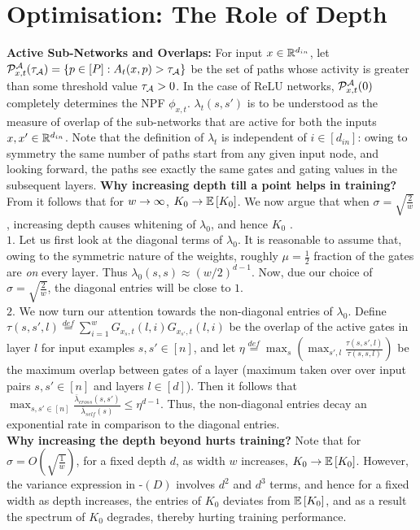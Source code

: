 \section{Optimisation: The Role of Depth}\label{sec:optimisation}
\textbf{Active Sub-Networks and Overlaps:} For input $x\in\mathbb{R}^{d_{in}}$, let $\mathcal{P}^{\mathcal{A}}_{x,t}(\tau_{\mathcal{A}})=\{p\in[P]:A_t(x,p)>\tau_{\mathcal{A}}\}$ be the set of paths whose activity is greater than some threshold value $\tau_{\mathcal{A}}>0$. In the case of ReLU networks, $\mathcal{P}^{\mathcal{A}}_{x,t}(0)$ completely determines the NPF $\phi_{x,t}$. $\lambda_t(s,s')$ is to be understood as the measure of overlap of the sub-networks that are active for both the inputs $x,x'\in\mathbb{R}^{d_{in}}$. Note that the definition of $\lambda_t$ is independent of $i\in [d_{in}]$: owing to symmetry the same number of paths start from any given input node, and looking forward, the paths see exactly the same gates and gating values in the subsequent layers.
\textbf{Why increasing depth till a point helps in training? }From  it follows that for $w\rightarrow\infty$, $K_0\rightarrow\mathbb{E}\left[K_0\right]$. We now argue that when $\sigma=\sqrt{\frac{2}{w}}$, increasing depth causes whitening of $\lambda_0$, and hence $K_0$ .\hfill\\
$1.$ Let us first look at the diagonal terms of $\lambda_0$. It is reasonable to assume that, owing to the symmetric nature of the weights, roughly $\mu=\frac{1}{2}$ fraction of the gates are \emph{on} every layer. Thus $\lambda_0(s,s)\approx (w/2)^{d-1}$. Now, due our choice of $\sigma=\sqrt{\frac{2}{w}}$, the diagonal entries will be close to $1$.\hfill\\
$2.$ We now turn our attention towards the non-diagonal entries of $\lambda_0$. Define $\tau(s,s',l)\stackrel{def}=\sum_{i=1}^w G_{x_s,t}(l,i)G_{x_{s'},t}(l,i)$ be the overlap of the active gates in layer $l$ for input examples $s,s'\in[n]$, and  let $\eta\stackrel{def}=\max_s\left(\max_{s',l} \frac{\tau(s,s',l)}{\tau(s,s,l)}\right)$ be the maximum overlap between gates of a layer (maximum taken over over input pairs $s,s'\in[n]$ and layers $l\in [d]$).  Then it follows that $\max_{s,s'\in [n]} \frac{\bar{\lambda}_{cross}(s,s')}{\bar{\lambda}_{self}(s)}\leq \eta^{d-1}$. Thus, the non-diagonal entries decay an exponential rate in comparison to the diagonal entries.\hfill\\
\textbf{Why increasing the depth beyond hurts training?} Note that for $\sigma=O\left(\sqrt{\frac{1}{w}}\right)$, for a fixed depth $d$, as width $w$ increases, $K_0\rightarrow\mathbb{E}\left[K_0\right]$. However, the variance expression in -$(D)$ involves $d^2$ and $d^3$ terms, and hence for a fixed width as depth increases, the entries of $K_0$ deviates from $\mathbb{E}\left[K_0\right]$, and as a result the spectrum of $K_0$ degrades, thereby hurting training performance.

